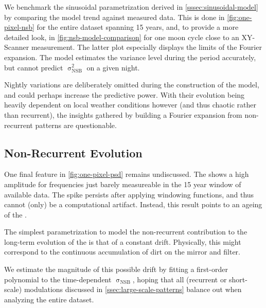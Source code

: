 We benchmark the sinusoidal parametrization derived in 
\cref{sssec:sinusoidal-model} by comparing the model trend against measured 
\NSB data. This is done in \cref{fig:one-pixel-nsb} for the entire dataset 
spanning 15 years, and, to provide a more detailed look, in 
\cref{fig:nsb-model-comparison} for one moon cycle close to an XY-Scanner 
measurement. The latter plot especially displays the limits of the Fourier 
expansion. The model estimates the variance level during the \DAQ period 
accurately, but cannot predict $\upsigma_\mathrm{NSB}^2$ on a given night.

Nightly variations are deliberately omitted during the construction of the 
model, and could perhaps increase the predictive power. With their evolution 
being heavily dependent on local weather conditions however (and thus chaotic 
rather than recurrent), the insights gathered by building a Fourier expansion 
from non-recurrent patterns are questionable.


\subsection{Non-Recurrent Evolution}

One final feature in \cref{fig:one-pixel-psd} remains undiscussed. The \PSD 
shows a high amplitude for frequencies just barely measureable in the 15 year 
window of available data. The spike persists after applying windowing 
functions, and thus cannot (only) be a computational artifact. Instead, this 
result points to an ageing of the \FD.

The simplest parametrization to model the non-recurrent contribution to the 
long-term evolution of the \NSB is that of a constant drift. Physically, this
might correspond to the continuous accumulation of dirt on the \FD mirror and 
filter. 

We estimate the magnitude of this possible drift by fitting a first-order 
polynomial to the time-dependent $\upsigma_\mathrm{NSB}$, hoping that all 
(recurrent or short-scale) modulations discussed in 
\cref{ssec:large-scale-patterns} balance out when analyzing the entire dataset.

